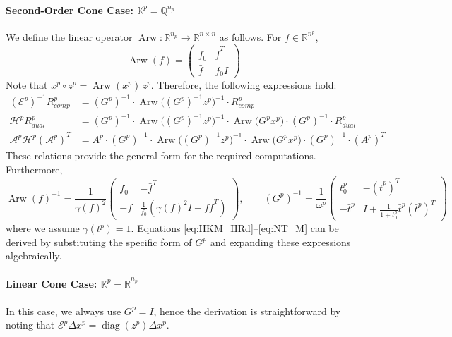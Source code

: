 \paragraph{Second-Order Cone Case: $\mathbb{K}^p=\mathbb{Q}^{n_p}$}
We define the linear operator $\operatorname{Arw}: \mathbb{R}^{n_p} \rightarrow \mathbb{R}^{n\times n}$ as follows. For $f\in \mathbb{R}^{n^p}$,
\begin{equation}
    \operatorname{Arw}(f) = 
    \left(
    \begin{array}{cc}
        f_0 & \bar{f}^T \\
        \bar{f} & f_0 I
    \end{array}
    \right)
\end{equation}
Note that $x^p \circ z^p = \operatorname{Arw}(x^p)\,z^p$. Therefore, the following expressions hold:
\begin{align*}
    (\mathcal{E}^p)^{-1}R^p_{comp} &= (G^p)^{-1} \cdot \operatorname{Arw}\big((G^p)^{-1} z^p\big)^{-1} \cdot R^p_{comp}\\
    \mathcal{H}^p R^p_{dual} &= (G^p)^{-1} \cdot \operatorname{Arw}\big((G^p)^{-1} z^p\big)^{-1} \cdot \operatorname{Arw}\big(G^p x^p\big) \cdot(G^p)^{-1} \cdot R^p_{dual}\\
    \mathcal{A}^p\mathcal{H}^p(\mathcal{A}^p)^T &= A^p \cdot (G^p)^{-1} \cdot \operatorname{Arw}\big((G^p)^{-1} z^p\big)^{-1} \cdot \operatorname{Arw}\big(G^p x^p\big) \cdot(G^p)^{-1} \cdot (A^p)^T
\end{align*}
These relations provide the general form for the required computations. 
Furthermore,
\begin{equation*}
    \operatorname{Arw}(f)^{-1} = \frac{1}{\gamma(f)^2} \left(\begin{array}{cc}
        f_0 & -\bar{f}^T \\
        -\bar{f} & \frac{1}{f_0}(\gamma(f)^2 I + \bar{f}\bar{f}^T)
    \end{array}\right),
    \qquad
    (G^p)^{-1} = \frac{1}{\omega^p} \begin{pmatrix}
        t^p_0 & -(\bar{t}^p)^T \\
        -\bar{t}^p & I+\frac{1}{1 + t^p_0} \bar{t}^p(\bar{t}^p)^T
    \end{pmatrix}
\end{equation*}
where we assume $\gamma(t^p)=1$. 
Equations \eqref{eq:HKM_HRd}--\eqref{eq:NT_M} can be derived by substituting the specific form of $G^p$ and expanding these expressions algebraically.

\paragraph{Linear Cone Case: $\mathbb{K}^p=\mathbb{R}^{n_p}_+$}
In this case, we always use $G^p=I$, hence the derivation is straightforward by noting that $\mathcal{E}^p \Delta x^p = \operatorname{diag}(z^p) \Delta x^p$.

